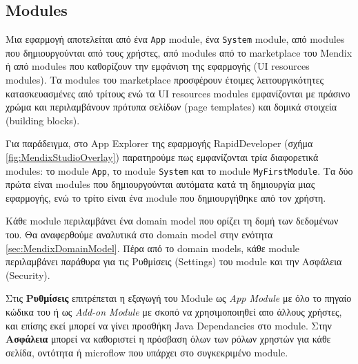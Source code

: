         \subsection{Modules}
            Μια εφαρμογή αποτελείται από ένα \texttt{App} module, ένα \texttt{System} module, από modules που δημιουργούνται από τους χρήστες, από modules από το marketplace του Mendix ή από modules που καθορίζουν την εμφάνιση της εφαρμογής (UI resources modules). Τα modules του marketplace προσφέρουν έτοιμες λειτουργικότητες κατασκευασμένες από τρίτους ενώ τα UI resources modules εμφανίζονται με πράσινο χρώμα και περιλαμβάνουν πρότυπα σελίδων (page templates) και δομικά στοιχεία (building blocks).

            Για παράδειγμα, στο App Explorer της εφαρμογής RapidDeveloper (σχήμα \ref{fig:MendixStudioOverlay}) παρατηρούμε πως εμφανίζονται τρία διαφορετικά modules: το module \texttt{App}, το module \texttt{System} και το module \texttt{MyFirstModule}. Τα δύο πρώτα είναι modules που δημιουργούνται αυτόματα κατά τη δημιουργία μιας εφαρμογής, ενώ το τρίτο είναι ένα module που δημιουργήθηκε από τον χρήστη.

            Κάθε module περιλαμβάνει ένα domain model που ορίζει τη δομή των δεδομένων του. Θα αναφερθούμε αναλυτικά στο domain model στην ενότητα \ref{sec:MendixDomainModel}. Πέρα από το domain models, κάθε module περιλαμβάνει παράθυρα για τις Ρυθμίσεις (Settings) του module και την Ασφάλεια (Security).

            Στις \textbf{Ρυθμίσεις} επιτρέπεται η εξαγωγή του Module ως \textit{App Module} με όλο το πηγαίο κώδικα του ή ως \textit{Add-on Module} με σκοπό να χρησιμοποιηθεί απο άλλους χρήστες, και επίσης εκεί μπορεί να γίνει προσθήκη Java Dependancies στο module. Στην \textbf{Ασφάλεια} μπορεί να καθοριστεί η πρόσβαση όλων των ρόλων χρηστών για κάθε σελίδα, οντότητα ή microflow που υπάρχει στο συγκεκριμένο module.

